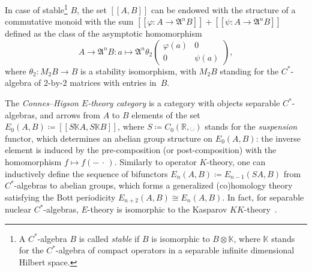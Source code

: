 \documentclass[10pt]{simplearticle}
\newcommand{\mmph}{\text{{␣}}}
\newcommand{\oK}{\mathbb{K}}
\newcommand{\myllbracket}{[[}
\newcommand{\myrrbracket}{]]}
\newcommand{\bbrackets}[1]{\myllbracket#1\myrrbracket}
\newcommand{\singledot}{\,\cdot\,}
\begin{document}
In case of stable\footnote{A $C^{*}$-algebra $B$ is called \emph{stable} if $B$ is isomorphic
to $B\otimes\oK$, where $\oK$ stands for the $C^{*}$-algebra of
compact operators in a separable infinite dimensional Hilbert space.} $B$, the set $\bbrackets{A,B}$ can be endowed with the structure
of a commutative monoid with the sum $\bbrackets{\varphi\colon A\to\mathfrak{A}^{n}B}+\bbrackets{\psi\colon A\to\mathfrak{A}^{n}B}$
defined as the class of the asymptotic homomorphism
\begin{equation}
A\to\mathfrak{A}^{n}B\colon a\mapsto\mathfrak{A}^{n}\theta_{2}\left(\begin{array}{cc}
\varphi(a) & 0\\
0 & \psi(a)
\end{array}\right),\label{eq:ashom-compos}
\end{equation}
where $\theta_{2}\colon M_{2}B\to B$ is a stability isomorphism,
with $M_{2}B$ standing for the $C^{*}$-algebra of $2\textrm{-by-}2$
matrices with entries in~$B$.

The \emph
{Connes--Higson $E$-theory category} is a category with
objects separable $C^{*}$-algebras, and arrows from $A$ to $B$
elements of the set $E_{0}(A,B)\coloneqq\bbrackets{S\oK A,S\oK B}$,
where $S\coloneqq C_{0}(\mathbb{R},\mmph)$ stands for the \emph
{suspension}
functor, which determines an abelian group structure on $E_{0}(A,B)$:
the inverse element is induced by the pre-composition (or post-composition)
with the homomorphism $f\mapsto f(-\singledot)$. Similarly to operator
$K$-theory, one can inductively define the sequence of bifunctors
$E_{n}(A,B)\coloneqq E_{n-1}(SA,B)$ from $C^{*}$-algebras to abelian
groups, which forms a generalized (co)homology theory satisfying the
Bott periodicity $E_{n+2}(A,B)\cong E_{n}(A,B)$. In fact, for separable
nuclear $C^{*}$-algebras, $E$-theory is isomorphic to the Kasparov
$KK$-theory~\cite[Theorem~25.6.3]{blackadar1998}.
\end{document}
